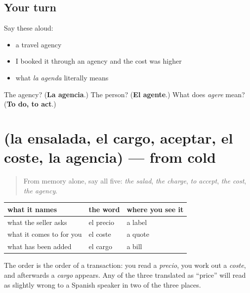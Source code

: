 \subsection*{Your turn}
Say these aloud:

\begin{itemize}
\raggedright
  \item a travel agency
  \item I booked it through an agency and the cost was higher
  \item what \emph{la agenda} literally means
\end{itemize}

\begin{tcolorbox}[breakable,colback=teal!4,colframe=teal!35!black,title={Before you move on}]
The agency? (\textbf{La agencia}.) The person? (\textbf{El agente}.) What does \emph{agere} mean? (\textbf{To do, to act}.)
\end{tcolorbox}
\section[(la ensalada, el cargo, aceptar, el …]{(la ensalada, el cargo, aceptar, el coste, la agencia) — from cold}

\label{lesson:ES-R456-repaso-cuenta}



\begin{quote}
From memory alone, say all five: \emph{the salad}, \emph{the charge}, \emph{to accept}, \emph{the cost}, \emph{the agency}.
\end{quote}

\begin{grammarlens}[title={Grammar Lens: three words for money on a page}]
\noindent
\begin{tabularx}{\linewidth}{@{}>{\raggedright\arraybackslash}X>{\raggedright\arraybackslash}X>{\raggedright\arraybackslash}X@{}}
\toprule
\textbf{what it names} & \textbf{the word} & \textbf{where you see it} \\
\midrule
what the seller asks & el precio & a label \\
what it comes to for you & el coste & a quote \\
what has been added & el cargo & a bill \\
\bottomrule
\end{tabularx}

The order is the order of a transaction: you read a \emph{precio}, you work out a \emph{coste}, and afterwards a \emph{cargo} appears. Any of the three translated as \textquotedblleft{}price\textquotedblright{} will read as slightly wrong to a Spanish speaker in two of the three places.
\end{grammarlens}

